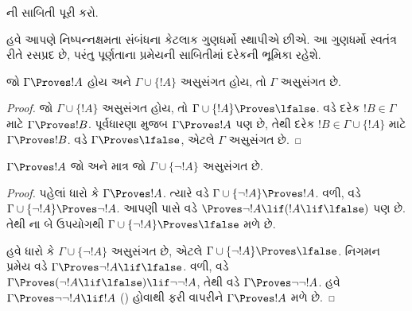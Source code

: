 \begin{prob}
  ની સાબિતી પૂરી કરો.
\end{prob}
\endgroup


\begingroup
\makeatletter{}\makeatother


\label{guunit:OLP-0121}


હવે આપણે નિષ્પન્નક્ષમતા સંબંધના કેટલાક ગુણધર્મો સ્થાપીએ છીએ. આ
ગુણધર્મો સ્વતંત્ર રીતે રસપ્રદ છે, પરંતુ પૂર્ણતાના પ્રમેયની સાબિતીમાં
દરેકની ભૂમિકા રહેશે.

\begin{prop}
  જો $\Gamma \Proves !A$ હોય અને $\Gamma \cup \{!A\}$ અસુસંગત હોય,
  તો $\Gamma$ અસુસંગત છે.
\end{prop}

\begin{proof}
  જો $\Gamma \cup \{!A\}$ અસુસંગત હોય, તો
  $\Gamma \cup \{!A\} \Proves \lfalse$. 
  વડે દરેક $!B \in \Gamma$ માટે $\Gamma \Proves !B$. પૂર્વધારણા
  મુજબ $\Gamma \Proves !A$ પણ છે, તેથી દરેક
  $!B \in \Gamma \cup \{!A\}$ માટે $\Gamma \Proves !B$.
   વડે $\Gamma \Proves \lfalse$, એટલે
  $\Gamma$ અસુસંગત છે.
\end{proof}

\begin{prop}
$\Gamma \Proves !A$ જો અને માત્ર જો $\Gamma \cup \{\lnot !A\}$
અસુસંગત છે.
\end{prop}

\begin{proof}
પહેલાં ધારો કે $\Gamma \Proves !A$. ત્યારે
 વડે
$\Gamma \cup \{\lnot !A\} \Proves !A$. વળી,
 વડે
$\Gamma \cup \{\lnot !A\} \Proves \lnot !A$. આપણી પાસે
 વડે
$\Proves \lnot !A \lif (!A \lif \lfalse)$ પણ છે. તેથી
ના બે ઉપયોગથી
$\Gamma \cup \{\lnot !A\} \Proves \lfalse$ મળે છે.

હવે ધારો કે $\Gamma \cup \{\lnot !A\}$ અસુસંગત છે, એટલે
$\Gamma \cup \{\lnot !A\} \Proves \lfalse$. નિગમન પ્રમેય વડે
$\Gamma \Proves \lnot !A \lif \lfalse$. વળી,
 વડે
$\Gamma \Proves (\lnot !A \lif \lfalse) \lif \lnot\lnot !A$, તેથી
 વડે $\Gamma \Proves \lnot\lnot !A$. હવે
$\Gamma \Proves \lnot\lnot !A \lif !A$ () હોવાથી
 ફરી વાપરીને $\Gamma \Proves !A$ મળે છે.
\end{proof}

